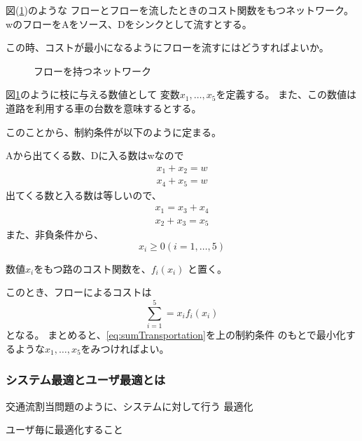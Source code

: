 \documentclass[9pt]{ltjsreport}
\begin{document}
図(\ref{fig:transportationflaw})のような
フローとフローを流したときのコスト関数をもつネットワーク。
wのフローをAをソース、Dをシンクとして流すとする。

この時、コストが最小になるようにフローを流すにはどうすればよいか。
\begin{figure}[h]
\centering
\caption{フローを持つネットワーク}
\label{fig:transportationflaw}
\end{figure}

\hrulefill

図\ref{fig:transportationflaw}のように枝に与える数値として
変数$x_1,\dots,x_5$を定義する。
また、この数値は道路を利用する車の台数を意味するとする。

このことから、制約条件が以下のように定まる。

Aから出てくる数、Dに入る数はwなので
\begin{gather}
    x_1+x_2=w\\
    x_4+x_5=w
\end{gather}
出てくる数と入る数は等しいので、
\begin{gather}
    x_1=x_3+x_4\\
    x_2+x_3=x_5
\end{gather}
また、非負条件から、
\begin{equation}
    x_i \ge 0 (i=1,\dots,5)
\end{equation}

数値$x_i$をもつ路のコスト関数を、$f_i(x_i)$
と置く。

このとき、フローによるコストは
\begin{equation}
    \sum_{i=1}^5=x_if_i(x_i) \label{eq:sumTransportation}
\end{equation}
となる。
まとめると、\ref{eq:sumTransportation}を上の制約条件
のもとで最小化するような$x_1,\dots,x_5$をみつければよい。

\subsubsection{システム最適とユーザ最適とは}
\begin{tcolorbox}[title=システム最適]
    交通流割当問題のように、システムに対して行う
    最適化
\end{tcolorbox}
\begin{tcolorbox}[title=ユーザ最適]
    ユーザ毎に最適化すること
\end{tcolorbox}
\end{document}
